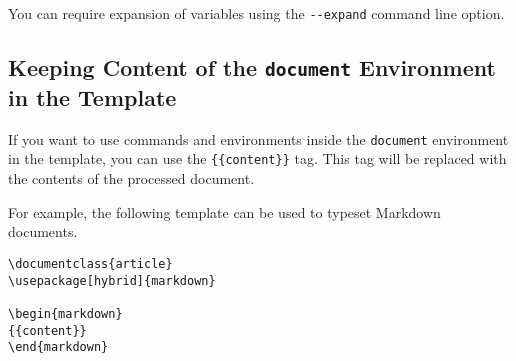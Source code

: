 You can require expansion of variables using the \verb|--expand| command line option.

\subsection{Keeping Content of the \texttt{document} Environment in the Template}

If you want to use commands and environments inside the \texttt{document} environment in the template,
you can use the \verb|{{content}}| tag. This tag will be replaced with the contents of the processed document.

For example, the following template can be used to typeset Markdown documents. 

\begin{verbatim}
\documentclass{article}
\usepackage[hybrid]{markdown}

\begin{markdown}
{{content}}
\end{markdown}

\end{verbatim}
